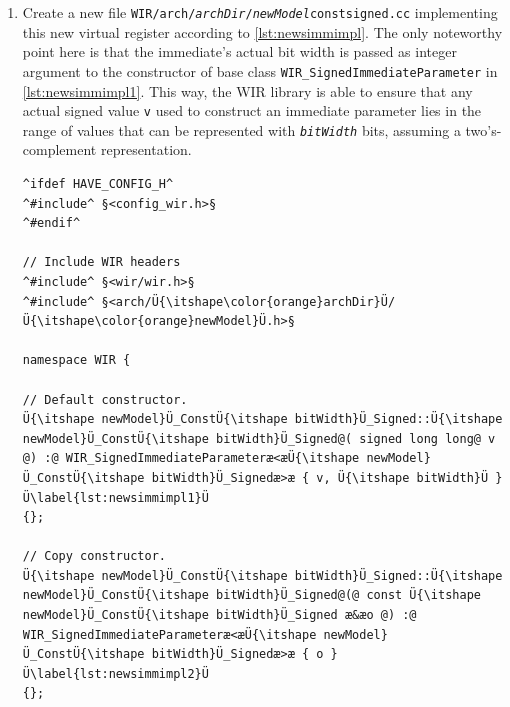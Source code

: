 \begin{enumerate}[resume]
\begin{lstlisting}[style=code,float=!t,caption={Header File for a New Signed Immediate Parameter's Class},label=lst:newsimmheader]
    // Move-assignment operator.
    Ü{\itshape newModel}Ü_ConstÜ{\itshape bitWidth}Ü_Signed æ&æ operator æ=æ @(@ Ü{\itshape newModel}Ü_ConstÜ{\itshape bitWidth}Ü_Signed æ&&æo @)@;Ü\label{lst:newsimmheader8}Ü
};

}       // namespace WIR

^#endif^
\end{lstlisting}

  Other than that, only the usual copy/move constructors and assignment operators as well as the virtual destructor need to be provided.

  Have this header file included by file \texttt{WIR/arch/{\itshape archDir}/{\itshape newModel}.h}.

  \item Create a new file \texttt{WIR/arch/{\itshape archDir}/{\itshape newModel}constsigned.cc} implementing this new virtual register according to \cref{lst:newsimmimpl}.\label{enum:newsimmimpl}
  The only noteworthy point here is that the immediate's actual bit width is passed as integer argument to the constructor of base class \texttt{WIR\_SignedImmediateParameter} in \cref{lst:newsimmimpl1}.
  This way, the \gls{WIR} library is able to ensure that any actual signed value \texttt{v} used to construct an immediate parameter lies in the range of values that can be represented with \texttt{\itshape bitWidth} bits, assuming a two's-complement representation.

\begin{lstlisting}[style=code,float=!t,caption={Implementation of a New Signed Immediate Parameter's Class},label=lst:newsimmimpl]
^ifdef HAVE_CONFIG_H^
^#include^ §<config_wir.h>§
^#endif^

// Include WIR headers
^#include^ §<wir/wir.h>§
^#include^ §<arch/Ü{\itshape\color{orange}archDir}Ü/Ü{\itshape\color{orange}newModel}Ü.h>§

namespace WIR {

// Default constructor.
Ü{\itshape newModel}Ü_ConstÜ{\itshape bitWidth}Ü_Signed::Ü{\itshape newModel}Ü_ConstÜ{\itshape bitWidth}Ü_Signed@( signed long long@ v @) :@ WIR_SignedImmediateParameteræ<æÜ{\itshape newModel}Ü_ConstÜ{\itshape bitWidth}Ü_Signedæ>æ { v, Ü{\itshape bitWidth}Ü }Ü\label{lst:newsimmimpl1}Ü
{};

// Copy constructor.
Ü{\itshape newModel}Ü_ConstÜ{\itshape bitWidth}Ü_Signed::Ü{\itshape newModel}Ü_ConstÜ{\itshape bitWidth}Ü_Signed@(@ const Ü{\itshape newModel}Ü_ConstÜ{\itshape bitWidth}Ü_Signed æ&æo @) :@ WIR_SignedImmediateParameteræ<æÜ{\itshape newModel}Ü_ConstÜ{\itshape bitWidth}Ü_Signedæ>æ { o }Ü\label{lst:newsimmimpl2}Ü
{};


\end{lstlisting}
\end{enumerate}
